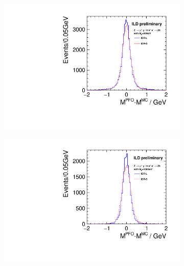 \begin{figure}[htbp]
\begin{subfigure}{0.475\hsize} 
\includegraphics[width=\textwidth]{Performance/fig/lepton_pair_inm_difference_nh20.pdf}
 \caption{ \label{fig:extraH:Mdiff:mh20}}
 \end{subfigure}
\begin{subfigure}{0.475\hsize} 
\includegraphics[width=\textwidth]{Performance/fig/lepton_pair_inm_difference_nh100.pdf}
 \caption{  \label{fig:extraH:Mdiff:mh100}}
 \end{subfigure}
\begin{subfigure}{0.475\hsize} 

\end{subfigure}
\end{figure}
